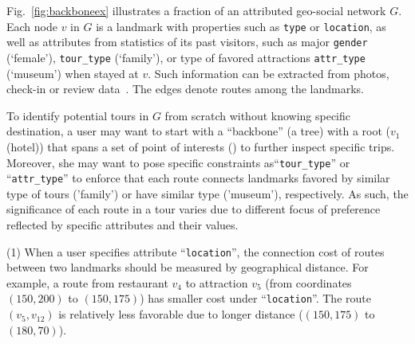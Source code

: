 \begin{example}
\label{exa-motivate}
Fig.~\ref{fig:backboneex} illustrates a fraction of an attributed geo-social network $G$. Each node $v$ in $G$
is a landmark with properties such as \texttt{type} 
or \texttt{location},
as well as attributes from statistics of
its past visitors, such as major \texttt{gender} (\eg `female'), \texttt{tour\_type} (\eg `family'), or
type of favored attractions
\texttt{attr\_type} (\eg `museum')
when stayed at $v$. Such information
can be extracted from 
photos, check-in or review data~\cite{cheng2011personalized}.
The edges denote routes among
the landmarks. %


To identify potential tours in $G$ from scratch without 
knowing specific destination, a 
user may want to start with a ``backbone'' (a tree)
with a root (\eg $v_1$ (hotel)) that 
spans a set of point of interests (\pois) 
to further inspect specific trips. 
Moreover, she may want to pose specific constraints 
as``\texttt{tour\_type}'' or ``\texttt{attr\_type}'' 
to enforce that each route connects landmarks 
favored by similar type of tours (\eg 'family') or have similar type (\eg 'museum'), 
respectively. 
As such, 
the significance of each route in a tour %
varies due to different focus of preference
reflected by specific
attributes and their values. 


\sstab
(1) When a user
specifies attribute ``\texttt{location}'', 
the connection cost of
routes between two landmarks should be measured by 
geographical distance. For example, 
a route from restaurant $v_4$ to attraction $v_5$
(from coordinates $(150,200)$ to $(150,175)$) 
has smaller cost under ``\texttt{location}''. 
The route $(v_5, v_{12})$ is relatively less favorable
due to longer distance ($(150,175)$ to $(180,70)$). 


\end{example}
